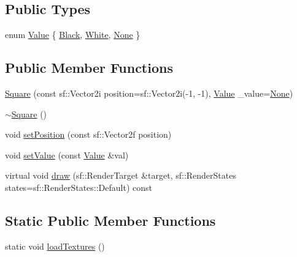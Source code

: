 \subsection*{Public Types}
\begin{DoxyCompactItemize}
\item 
enum \hyperlink{class_square_a7feeec236c037a9849114226adaa4ecc}{Value} \{ \hyperlink{class_square_a7feeec236c037a9849114226adaa4ecca936fd42872fc81c4f23c3aa55321a73d}{Black}, 
\hyperlink{class_square_a7feeec236c037a9849114226adaa4ecca9eef9b633453678b028f5ea97a69ab32}{White}, 
\hyperlink{class_square_a7feeec236c037a9849114226adaa4ecca9b58b122a01aff177f48dc845711ffaf}{None}
 \}
\end{DoxyCompactItemize}
\subsection*{Public Member Functions}
\begin{DoxyCompactItemize}
\item 
\hyperlink{class_square_a53fbf885454472fc818f541ecae5a80f}{Square} (const sf\+::\+Vector2i position=sf\+::\+Vector2i(-\/1, -\/1), \hyperlink{class_square_a7feeec236c037a9849114226adaa4ecc}{Value} \+\_\+value=\hyperlink{class_square_a7feeec236c037a9849114226adaa4ecca9b58b122a01aff177f48dc845711ffaf}{None})
\item 
\hyperlink{class_square_a90af7ce1060cff7b717ceddb333846b8}{$\sim$\+Square} ()
\item 
void \hyperlink{class_square_a9040f1ca39b88b8d9ac2a90648b1fb20}{set\+Position} (const sf\+::\+Vector2f position)
\item 
void \hyperlink{class_square_a5fa0cbfce721c687308eec8e1a029d25}{set\+Value} (const \hyperlink{class_square_a7feeec236c037a9849114226adaa4ecc}{Value} \&val)
\item 
virtual void \hyperlink{class_square_a6665fa34ce5e672a880a253b1a21fb78}{draw} (sf\+::\+Render\+Target \&target, sf\+::\+Render\+States states=sf\+::\+Render\+States\+::\+Default) const
\end{DoxyCompactItemize}
\subsection*{Static Public Member Functions}
\begin{DoxyCompactItemize}
\item 
static void \hyperlink{class_square_af03bbde12cc43feb90c4f0676e00ce72}{load\+Textures} ()
\end{DoxyCompactItemize}


